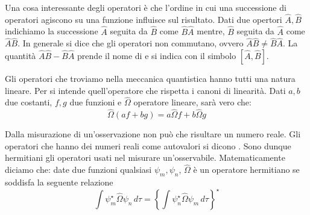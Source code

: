 Una cosa interessante degli operatori è che l'ordine in cui una successione di operatori agiscono su una funzione influisce sul risultato. Dati due opertori $\hat{A}, \hat{B}$ indichiamo la successione $\hat{A}$ seguita da $\hat{B}$ come $\hat{B}\hat{A}$ mentre, $\hat{B}$ seguita da $\hat{A}$ come $\hat{A}\hat{B}$.
In generale si dice che gli operatori non commutano, ovvero $\hat{A}\hat{B} \ne \hat{B}\hat{A}$. La quantità $\hat{A}\hat{B} - \hat{B}\hat{A}$ prende il nome di  e si indica con il simbolo $[\hat{A},\hat{B}]$.

Gli operatori che troviamo nella meccanica quantistica hanno tutti una natura lineare. Per  si intende quell'operatore che rispetta i canoni di linearità. Dati $a, b$ due costanti, $f, g$ due funzioni e $\hat{\Omega}$ operatore lineare, sarà vero che:
$$\hat{\Omega}( af + bg ) = a \hat{\Omega} f + b \hat{\Omega} g$$

Dalla misurazione di un'osservazione non può che risultare un numero reale. Gli operatori che hanno dei numeri reali come autovalori si dicono . Sono dunque hermitiani gli operatori usati nel misurare un'osservabile. Matematicamente diciamo che: date due funzioni qualsiasi $\psi_m, \psi_n$, $\hat{\Omega}$ è un operatore hermitiano se soddisfa la seguente relazione
$$\int \psi_m^{\star} \hat{\Omega} \psi_n\, d\tau = \left \{ \int \psi_n^{\star} \hat{\Omega} \psi_m\, d\tau \right \}^{\star}$$
